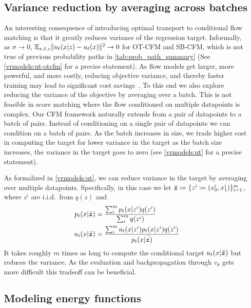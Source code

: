 \documentclass[10pt]{article}
\theoremstyle{plain}
\theoremstyle{definition}
\theoremstyle{remark}
\begin{document}
\subsection{Variance reduction by averaging across batches}\label{sec:vraab}

An interesting consequence of introducing optimal transport to conditional flow matching is that it greatly reduces variance of the regression target. Informally, as $\sigma \to 0$, $\mathbb{E}_{x,t,z} \|u_t(x | z) - u_t(x)\|^2 \to 0$ for OT-CFM and SB-CFM, which is not true of previous probability paths in \autoref{tab:prob_path_summary} (See \autoref{vrmodels:ut-otcfm} for a precise statement). As flow models get larger, more powerful, and more costly, reducing objective variance, and thereby faster training may lead to significant cost savings~\citep{watson_broadly_2022}. To this end we also explore reducing the variance of the objective by averaging over a batch. This is not feasible in score matching where the flow conditioned on multiple datapoints is complex. Our CFM framework naturally extends from a pair of datapoints to a batch of pairs. Instead of conditioning on a single pair of datapoints we can condition on a batch of pairs. As the batch increases in size, we trade higher cost in computing the target for lower variance in the target as the batch size increases, the variance in the target goes to zero (see \autoref{vrmodels:ut} for a precise statement). 

As formalized in \autoref{vrmodels:ut}, we can reduce variance in the target by averaging over multiple datapoints. Specifically, in this case we let $\bar{{\bm{z}}} \coloneqq \{z^i \coloneqq (x_0^i, x_1^i)\}_{i=1}^m$, where $z^i$ are i.i.d.\ from $q(z)$ and
\begin{align}
p_t(x | \bar{{\bm{z}}}) &=  \frac{\sum_i^m p_t(x | z^i)q(z^i)}{\sum_i^m q(z^i)} \label{eq:vrcfm:pt}\\
u_t(x | \bar{{\bm{z}}}) &= \frac{\sum_i^m  u_t(x | z^i) p_t(x | z^i) q(z^i)}{p_t(x | \bar{{\bm{z}})}}\label{eq:vrcfm:ut}
\end{align}
It takes roughly $m$ times as long to compute the conditional target $u_t(x | \bar{{\bm{z}}})$ but reduces the variance. As the evaluation and backpropagation through $v_\theta$ gets more difficult this tradeoff can be beneficial. 

\subsection{Modeling energy functions}\label{sec:ebcfm}
\end{document}
